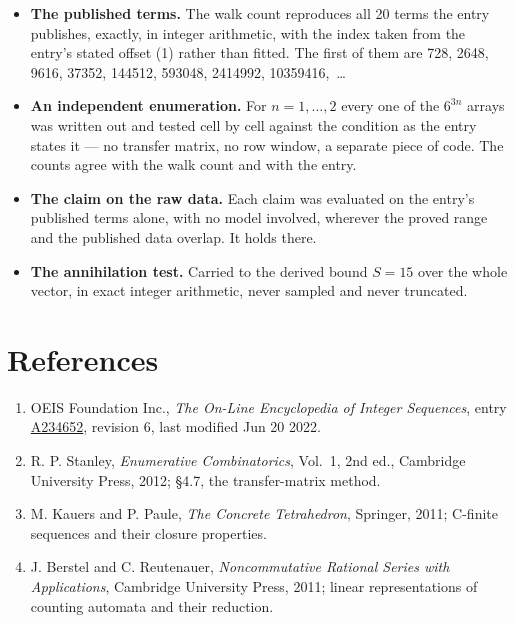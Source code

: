 \documentclass[11pt]{article}
\theoremstyle{definition}
\begin{document}
\begin{itemize}

\item {\bfseries The published terms.} The walk count reproduces all 20 terms the entry publishes, exactly, in integer arithmetic, with the index taken from the entry's stated offset (1) rather than fitted. The first of them are 728, 2648, 9616, 37352, 144512, 593048, 2414992, 10359416,~\dots

\item {\bfseries An independent enumeration.} For $n = 1,\dots,2$ every one of the $6^{3n}$ arrays was written out and tested cell by cell against the condition as the entry states it --- no transfer matrix, no row window, a separate piece of code. The counts agree with the walk count and with the entry.

\item {\bfseries The claim on the raw data.} Each claim was evaluated on the entry's published terms alone, with no model involved, wherever the proved range and the published data overlap. It holds there.

\item {\bfseries The annihilation test.} Carried to the derived bound $S = 15$ over the whole vector, in exact integer arithmetic, never sampled and never truncated.

\end{itemize}

\section{References}

\begin{enumerate}

\item OEIS Foundation Inc., \emph{The On-Line Encyclopedia of Integer Sequences}, entry \href{https://oeis.org/A234652}{A234652}, revision 6, last modified Jun 20 2022.

\item R. P. Stanley, \emph{Enumerative Combinatorics}, Vol.~1, 2nd ed., Cambridge University Press, 2012; \S4.7, the transfer-matrix method.

\item M. Kauers and P. Paule, \emph{The Concrete Tetrahedron}, Springer, 2011; C-finite sequences and their closure properties.

\item J. Berstel and C. Reutenauer, \emph{Noncommutative Rational Series with Applications}, Cambridge University Press, 2011; linear representations of counting automata and their reduction.

\end{enumerate}
\end{document}
